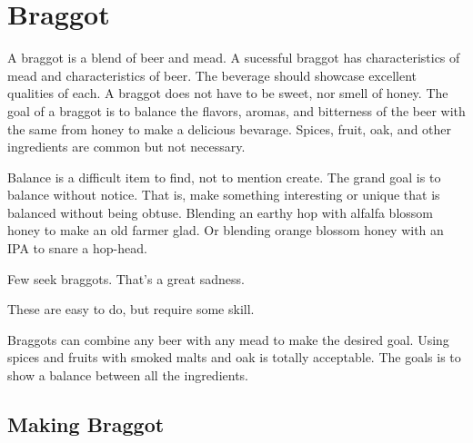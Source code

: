 \section{Braggot}
 A braggot is a blend of beer and mead. A sucessful braggot has characteristics of mead and characteristics of beer.
 The beverage should showcase excellent qualities of each.
 A braggot does not have to be sweet, nor smell of honey.
 The goal of a braggot is to balance the flavors, aromas, and bitterness of the beer with the same from honey to make a
 delicious bevarage. Spices, fruit, oak, and other ingredients are common but not necessary.

 Balance is a difficult item to find, not to mention create. The grand goal is to balance without notice. That is,
 make something interesting or unique that is balanced without being obtuse. Blending an earthy hop with alfalfa blossom
 honey to make an old farmer glad. Or blending orange blossom honey with an IPA to snare a hop-head.

 Few seek braggots. That's a great sadness.

 These are easy to do, but require some skill.

 Braggots can combine any beer with any mead to make the desired goal. Using spices
 and fruits with smoked malts and oak is totally acceptable. The goals is to show a balance between all
 the ingredients.

 \subsection{Making Braggot}